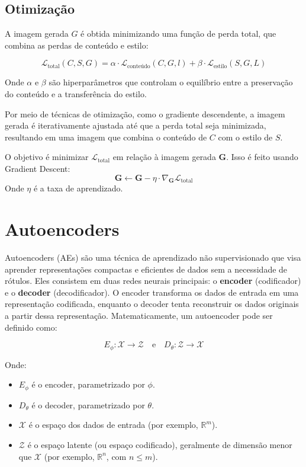 \documentclass[a4paper]{tufte-handout}
\begin{document}
\subsection{Otimização}

A imagem gerada $G$ é obtida minimizando uma função de perda total, que combina as perdas de conteúdo e estilo:

\begin{equation*}
    \mathcal{L}_{\text{total}} (C, S, G) = \alpha \cdot \mathcal{L}_{\text{conteúdo}} (C, G, l) + \beta \cdot \mathcal{L}_{\text{estilo}} (S, G, L)
\end{equation*}

Onde $\alpha$ e $\beta$ são hiperparâmetros que controlam o equilíbrio entre a preservação do conteúdo e a transferência do estilo.

Por meio de técnicas de otimização, como o gradiente descendente, a imagem gerada é iterativamente ajustada até que a perda total seja minimizada, resultando em uma imagem que combina o conteúdo de $C$ com o estilo de $S$.


O objetivo é minimizar \( \mathcal{L}_{\text{total}} \) em relação à imagem gerada \( \mathbf{G} \). Isso é feito usando Gradient Descent:
\[
\mathbf{G} \leftarrow \mathbf{G} - \eta \cdot \nabla_{\mathbf{G}} \mathcal{L}_{\text{total}}
\]
Onde \( \eta \) é a taxa de aprendizado.



\section{Autoencoders}

Autoencoders (AEs) são uma técnica de aprendizado não supervisionado que visa aprender representações compactas e eficientes de dados sem a necessidade de rótulos. Eles consistem em duas redes neurais principais: o \textbf{encoder} (codificador) e o \textbf{decoder} (decodificador). O encoder transforma os dados de entrada em uma representação codificada, enquanto o decoder tenta reconstruir os dados originais a partir dessa representação. Matematicamente, um autoencoder pode ser definido como:

\begin{equation*}
    E_{\phi}: \mathcal{X} \rightarrow \mathcal{Z} \quad \text{e} \quad D_{\theta}: \mathcal{Z} \rightarrow \mathcal{X}
\end{equation*}

Onde:
\begin{itemize}
    \item $E_{\phi}$ é o encoder, parametrizado por $\phi$.
    \item $D_{\theta}$ é o decoder, parametrizado por $\theta$.
    \item $\mathcal{X}$ é o espaço dos dados de entrada (por exemplo, $\mathbb{R}^m$).
    \item $\mathcal{Z}$ é o espaço latente (ou espaço codificado), geralmente de dimensão menor que $\mathcal{X}$ (por exemplo, $\mathbb{R}^n$, com $n \leq m$).
\end{itemize}
\end{document}
